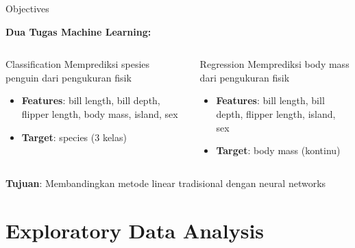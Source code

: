 \documentclass[aspectratio=169]{beamer}
\newcommand{\hl}[1]{\textcolor{AWSOrange}{\textbf{#1}}}
\newcommand{\hlb}[1]{\textcolor{AWSBlue}{\textbf{#1}}}
\newcommand{\hlg}[1]{\textcolor{AWSGreen}{\textbf{#1}}}
\newcommand{\hly}[1]{\textcolor{AWSYellow}{\textbf{#1}}}
\begin{document}
\begin{frame}{Objectives}
\fontsize{11}{12}\selectfont

\textbf{Dua Tugas Machine Learning:}

\vspace{0.2in}
\begin{columns}
\begin{block}{Classification}
Memprediksi spesies penguin dari pengukuran fisik
\begin{itemize}
    \item \hlb{Features}: bill length, bill depth, flipper length, body mass, island, sex
    \item \hlg{Target}: species (3 kelas)
\end{itemize}
\end{block}

\begin{block}{Regression}
Memprediksi body mass dari pengukuran fisik
\begin{itemize}
    \item \hlb{Features}: bill length, bill depth, flipper length, island, sex
    \item \hl{Target}: body mass (kontinu)
\end{itemize}
\end{block}
\end{columns}

\vspace{0.2in}
\hly{Tujuan}: Membandingkan metode linear tradisional dengan neural networks
\end{frame}

\section{Exploratory Data Analysis}
\end{document}
